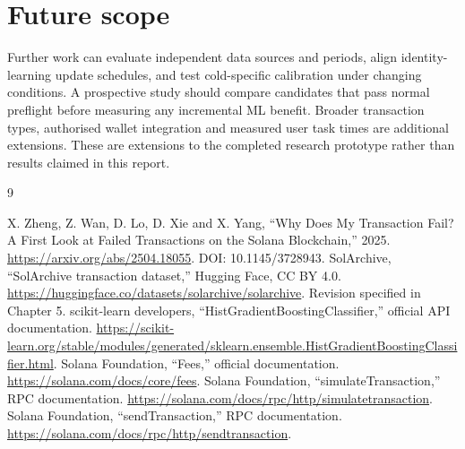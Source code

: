 \documentclass[12pt,a4paper,oneside]{report}
\begin{document}
\section{Future scope}
Further work can evaluate independent data sources and periods, align identity-learning update schedules, and test cold-specific calibration under changing conditions. A prospective study should compare candidates that pass normal preflight before measuring any incremental ML benefit. Broader transaction types, authorised wallet integration and measured user task times are additional extensions. These are extensions to the completed research prototype rather than results claimed in this report.
\renewcommand{\bibname}{REFERENCES}
\begin{thebibliography}{9}
 X. Zheng, Z. Wan, D. Lo, D. Xie and X. Yang, ``Why Does My Transaction Fail? A First Look at Failed Transactions on the Solana Blockchain,'' 2025. \url{https://arxiv.org/abs/2504.18055}. DOI: 10.1145/3728943.
 SolArchive, ``SolArchive transaction dataset,'' Hugging Face, CC BY 4.0. \url{https://huggingface.co/datasets/solarchive/solarchive}. Revision specified in Chapter 5.
 scikit-learn developers, ``HistGradientBoostingClassifier,'' official API documentation. \url{https://scikit-learn.org/stable/modules/generated/sklearn.ensemble.HistGradientBoostingClassifier.html}.
 Solana Foundation, ``Fees,'' official documentation. \url{https://solana.com/docs/core/fees}.
 Solana Foundation, ``simulateTransaction,'' RPC documentation. \url{https://solana.com/docs/rpc/http/simulatetransaction}.
 Solana Foundation, ``sendTransaction,'' RPC documentation. \url{https://solana.com/docs/rpc/http/sendtransaction}.
\end{thebibliography}
\end{document}
